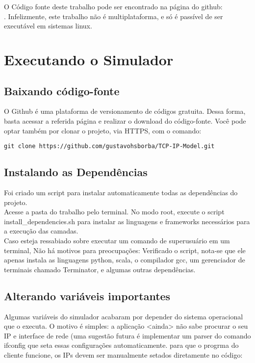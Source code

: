 \documentclass[11pt]{article}
\begin{document}
    O Código fonte deste trabalho pode ser encontrado na página do github: \\ [https\:\/\/github.com\/gustavohsborba\/TCP-IP-Model]. Infelizmente, este trabalho não é multiplataforma, e só é passível de ser executável em sistemas linux.
	
\section{Executando o Simulador}

	\subsection{Baixando código-fonte}

        O Github é uma plataforma de versionamento de códigos gratuita. Dessa forma, basta acessar a referida página e realizar o download do código-fonte. Você pode optar também por clonar o projeto, via HTTPS, com o comando:
        
\begin{lstlisting}
git clone https://github.com/gustavohsborba/TCP-IP-Model.git
\end{lstlisting} 
		
	\subsection{Instalando as Dependências}
	
	    Foi criado um script para instalar automaticamente todas as dependências do projeto. \\
	    Acesse a pasta do trabalho pelo terminal. No modo root, execute o script install\_dependencies.sh para instalar as linguagens e frameworks necessários para a execução das camadas. \\
	    Caso esteja ressabiado sobre executar um comando de superusuário em um terminal, Não há motivos para preocupações: Verificado o script, nota-se que ele apenas instala as linguagens python, scala, o compilador gcc, um gerenciador de terminais chamado Terminator, e algumas outras dependências. 
	
	\subsection{Alterando variáveis importantes}
    
        Algumas variáveis do simulador acabaram por depender do sistema operacional que o executa. O motivo é simples: a aplicação <ainda> não sabe procurar o seu IP e interface de rede (uma sugestão futura é implementar um parser do comando ifconfig que seta essas configurações automaticamente. para que o progrma do cliente funcione, os IPs devem ser manualmente setados diretamente no código:
        
\end{document}
